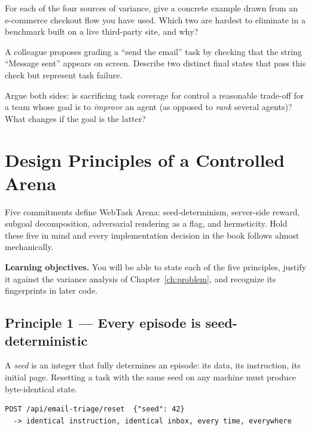 \documentclass[11pt,openany]{book}
\newcommand{\exhead}{\vspace{0.8em}\needspace{3\baselineskip}%
  \noindent{\large\bfseries\color{clayd}Exercises}\par\nobreak\vspace{0.3em}}
\begin{document}
\exhead
\begin{exercises}
\item For each of the four sources of variance, give a concrete example drawn
from an e-commerce checkout flow you have used. Which two are hardest to
eliminate in a benchmark built on a live third-party site, and why?
\item A colleague proposes grading a ``send the email'' task by checking that the
string ``Message sent'' appears on screen. Describe two distinct final states
that pass this check but represent task failure.
\item Argue both sides: is sacrificing task coverage for control a reasonable
trade-off for a team whose goal is to \emph{improve} an agent (as opposed to
\emph{rank} several agents)? What changes if the goal is the latter?
\end{exercises}

\chapter{Design Principles of a Controlled Arena}
\label{ch:principles}

\begin{keybox}[.\ ]
Five commitments define WebTask Arena: seed-determinism, server-side reward,
subgoal decomposition, adversarial rendering as a flag, and hermeticity. Hold
these five in mind and every implementation decision in the book follows almost
mechanically.
\end{keybox}

\textbf{Learning objectives.} You will be able to state each of the five
principles, justify it against the variance analysis of
Chapter~\ref{ch:problem}, and recognize its fingerprints in later code.

\section{Principle 1 — Every episode is seed-deterministic}

A \emph{seed} is an integer that fully determines an episode: its data, its
instruction, its initial page. Resetting a task with the same seed on any machine
must produce byte-identical state.

\begin{lstlisting}[style=sh]
POST /api/email-triage/reset  {"seed": 42}
  -> identical instruction, identical inbox, every time, everywhere
\end{lstlisting}
\end{document}
